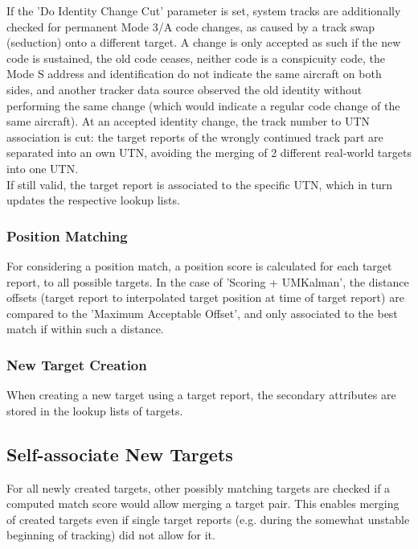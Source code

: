 If the 'Do Identity Change Cut' parameter is set, system tracks are additionally checked for permanent Mode 3/A code changes, as caused by a track swap (seduction) onto a different target. 
A change is only accepted as such if the new code is sustained, the old code ceases, neither code is a conspicuity code, the Mode S address and identification do not indicate the same aircraft on both sides, and another tracker data source observed the old identity without performing the same change (which would indicate a regular code change of the same aircraft). 
At an accepted identity change, the track number to UTN association is cut: the target reports of the wrongly continued track part are separated into an own UTN, avoiding the merging of 2 different real-world targets into one UTN. \\

If still valid, the target report is associated to the specific UTN, which in turn updates the respective lookup lists.

\subsubsection{Position Matching}

For considering a position match, a position score is calculated for each target report, to all possible targets. In the case of 'Scoring + UMKalman', the distance offsets (target report to interpolated target position at time of target report) are compared to the 'Maximum Acceptable Offset', and only associated to the best match if within such a distance.

\subsubsection{New Target Creation}

When creating a new target using a target report, the secondary attributes are stored in the lookup lists of targets.

\subsection{Self-associate New Targets}

For all newly created targets, other possibly matching targets are checked if a computed match score would allow merging a target pair. 
This enables merging of created targets even if single target reports (e.g. during the somewhat unstable beginning of tracking) did not allow for it.

